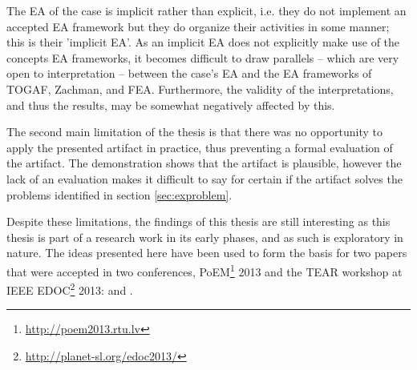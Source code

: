The EA of the case is implicit rather than explicit, i.e. they do not implement an accepted EA framework but they do organize their activities in some manner; this is their 'implicit EA'. As an implicit EA does not explicitly make use of the concepts EA frameworks, it becomes difficult to draw parallels -- which are very open to interpretation -- between the case's EA and the EA frameworks of TOGAF, Zachman, and FEA. Furthermore, the validity of the interpretations, and thus the results, may be somewhat negatively affected by this. 

The second main limitation of the thesis is that there was no opportunity to apply the presented artifact in practice, thus preventing a formal evaluation of the artifact. The demonstration shows that the artifact is plausible, however the lack of an evaluation makes it difficult to say for certain if the artifact solves the problems identified in section \ref{sec:exproblem}.

Despite these limitations, the findings of this thesis are still interesting as this thesis is part of a research work in its early phases, and as such is exploratory in nature. The ideas presented here have been used to form the basis for two papers that were accepted in two conferences, PoEM\footnote{\url{http://poem2013.rtu.lv}} 2013 and the TEAR workshop at IEEE EDOC\footnote{\url{http://planet-sl.org/edoc2013/}} 2013: \cite{speckert2013} and \cite{rychkova2013}.

  